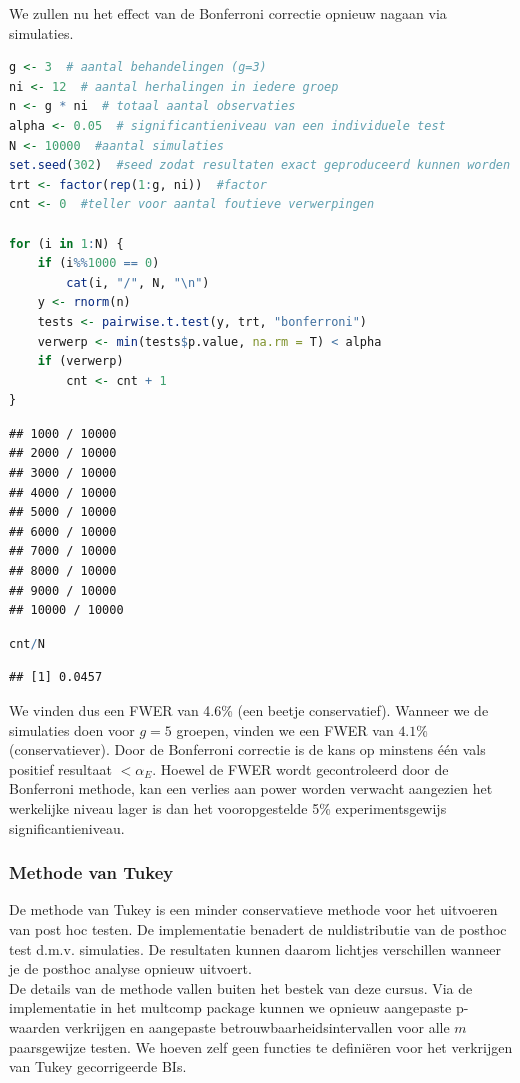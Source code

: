 \documentclass[
  12pt,dutch,coursenotes]{book}
\begin{document}
We zullen nu het effect van de Bonferroni correctie opnieuw nagaan via simulaties.

\begin{lstlisting}[language=R]
g <- 3  # aantal behandelingen (g=3)
ni <- 12  # aantal herhalingen in iedere groep
n <- g * ni  # totaal aantal observaties
alpha <- 0.05  # significantieniveau van een individuele test
N <- 10000  #aantal simulaties
set.seed(302)  #seed zodat resultaten exact geproduceerd kunnen worden
trt <- factor(rep(1:g, ni))  #factor
cnt <- 0  #teller voor aantal foutieve verwerpingen

for (i in 1:N) {
    if (i%%1000 == 0)
        cat(i, "/", N, "\n")
    y <- rnorm(n)
    tests <- pairwise.t.test(y, trt, "bonferroni")
    verwerp <- min(tests$p.value, na.rm = T) < alpha
    if (verwerp)
        cnt <- cnt + 1
}
\end{lstlisting}

\begin{lstlisting}
## 1000 / 10000 
## 2000 / 10000 
## 3000 / 10000 
## 4000 / 10000 
## 5000 / 10000 
## 6000 / 10000 
## 7000 / 10000 
## 8000 / 10000 
## 9000 / 10000 
## 10000 / 10000
\end{lstlisting}

\begin{lstlisting}[language=R]
cnt/N
\end{lstlisting}

\begin{lstlisting}
## [1] 0.0457
\end{lstlisting}

We vinden dus een FWER van 4.6\% (een beetje conservatief). Wanneer we de simulaties doen voor \(g=5\) groepen, vinden we een FWER van \(4.1\%\) (conservatiever). Door de Bonferroni correctie is de kans op minstens één vals positief resultaat \(< \alpha_E\). Hoewel de FWER wordt gecontroleerd door de Bonferroni methode, kan een verlies aan power worden verwacht aangezien het werkelijke niveau lager is dan het vooropgestelde 5\% experimentsgewijs significantieniveau.

\hypertarget{methode-van-tukey}{%
\subsubsection{Methode van Tukey}\label{methode-van-tukey}}

De methode van Tukey is een minder conservatieve methode voor het uitvoeren van post hoc testen.
De implementatie benadert de nuldistributie van de posthoc test d.m.v. simulaties.
De resultaten kunnen daarom lichtjes verschillen wanneer je de posthoc analyse opnieuw uitvoert.\\
De details van de methode vallen buiten het bestek van deze cursus.
Via de implementatie in het multcomp package kunnen we opnieuw aangepaste p-waarden verkrijgen en aangepaste betrouwbaarheidsintervallen voor alle \(m\) paarsgewijze testen.
We hoeven zelf geen functies te definiëren voor het verkrijgen van Tukey gecorrigeerde BIs.
\end{document}
